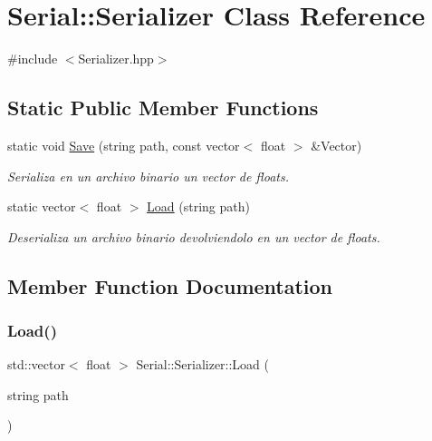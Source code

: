 \hypertarget{class_serial_1_1_serializer}{}\section{Serial\+::Serializer Class Reference}
\label{class_serial_1_1_serializer}


{\ttfamily \#include $<$Serializer.\+hpp$>$}

\subsection*{Static Public Member Functions}
\begin{DoxyCompactItemize}
\item 
static void \mbox{\hyperlink{class_serial_1_1_serializer_aba1c0b41e834ad9990ee0387e126dbf7}{Save}} (string path, const vector$<$ float $>$ \&Vector)
\begin{DoxyCompactList}\small\item\em Serializa en un archivo binario un vector de floats. \end{DoxyCompactList}\item 
static vector$<$ float $>$ \mbox{\hyperlink{class_serial_1_1_serializer_a56a80936b40aeb442b00c35aee514dac}{Load}} (string path)
\begin{DoxyCompactList}\small\item\em Deserializa un archivo binario devolviendolo en un vector de floats. \end{DoxyCompactList}\end{DoxyCompactItemize}


\subsection{Member Function Documentation}
\mbox{\label{class_serial_1_1_serializer_a56a80936b40aeb442b00c35aee514dac}} 
\subsubsection{\texorpdfstring{Load()}{Load()}}
{\footnotesize\ttfamily std\+::vector$<$ float $>$ Serial\+::\+Serializer\+::\+Load (\begin{DoxyParamCaption}\item[{string}]{path }\end{DoxyParamCaption})\hspace{0.3cm}{\ttfamily [static]}}



